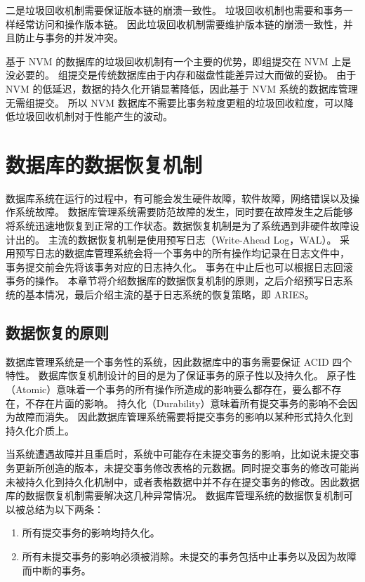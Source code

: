 二是垃圾回收机制需要保证版本链的崩溃一致性。
垃圾回收机制也需要和事务一样经常访问和操作版本链。
因此垃圾回收机制需要维护版本链的崩溃一致性，并且防止与事务的并发冲突。

基于 NVM 的数据库的垃圾回收机制有一个主要的优势，即组提交在 NVM 上是没必要的。
组提交是传统数据库由于内存和磁盘性能差异过大而做的妥协。
由于 NVM 的低延迟，数据的持久化开销显著降低，因此基于 NVM 系统的数据库管理无需组提交。
所以 NVM 数据库不需要比事务粒度更粗的垃圾回收粒度，可以降低垃圾回收机制对于性能产生的波动。


\section{数据库的数据恢复机制}

数据库系统在运行的过程中，有可能会发生硬件故障，软件故障，网络错误以及操作系统故障。
数据库管理系统需要防范故障的发生，同时要在故障发生之后能够将系统迅速地恢复到正常的工作状态。数据恢复机制是为了系统遇到非硬件故障设计出的。
主流的数据恢复机制是使用预写日志（Write-Ahead Log，WAL）。
采用预写日志的数据库管理系统会将一个事务中的所有操作均记录在日志文件中，
事务提交前会先将该事务对应的日志持久化。
事务在中止后也可以根据日志回滚事务的操作。
本章节将介绍数据库的数据恢复机制的原则，之后介绍预写日志系统的基本情况，最后介绍主流的基于日志系统的恢复策略，即 ARIES。

\subsection{数据恢复的原则}

数据库管理系统是一个事务性的系统，因此数据库中的事务需要保证 ACID 四个特性。
数据库恢复机制设计的目的是为了保证事务的原子性以及持久化。
原子性（Atomic）意味着一个事务的所有操作所造成的影响要么都存在，要么都不存在，不存在片面的影响。
持久化（Durability）意味着所有提交事务的影响不会因为故障而消失。
因此数据库管理系统需要将提交事务的影响以某种形式持久化到持久化介质上。

当系统遭遇故障并且重启时，系统中可能存在未提交事务的影响，比如说未提交事务更新所创造的版本，未提交事务修改表格的元数据。同时提交事务的修改可能尚未被持久化到持久化机制中，或者表格数据中并不存在提交事务的修改。因此数据库的数据恢复机制需要解决这几种异常情况。
数据库管理系统的数据恢复机制可以被总结为以下两条：
\begin{enumerate}
    \item 所有提交事务的影响均持久化。
    \item 所有未提交事务的影响必须被消除。未提交的事务包括中止事务以及因为故障而中断的事务。
\end{enumerate}


